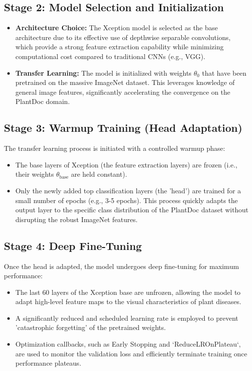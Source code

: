 \documentclass[12pt, a4paper]{report}
\begin{document}
\subsection{Stage 2: Model Selection and Initialization}
\label{sec:model_selection}
\begin{itemize}
    \item \textbf{Architecture Choice:} The Xception model is selected as the base architecture due to its effective use of depthwise separable convolutions, which provide a strong feature extraction capability while minimizing computational cost compared to traditional CNNs (e.g., VGG).
    \item \textbf{Transfer Learning:} The model is initialized with weights $\theta_0$ that have been pretrained on the massive ImageNet dataset. This leverages knowledge of general image features, significantly accelerating the convergence on the PlantDoc domain.
\end{itemize}

\subsection{Stage 3: Warmup Training (Head Adaptation)}
\label{sec:warmup_training}
The transfer learning process is initiated with a controlled warmup phase:
\begin{itemize}
    \item The base layers of Xception (the feature extraction layers) are frozen (i.e., their weights $\theta_{\text{base}}$ are held constant).
    \item Only the newly added top classification layers (the 'head') are trained for a small number of epochs (e.g., 3-5 epochs). This process quickly adapts the output layer to the specific class distribution of the PlantDoc dataset without disrupting the robust ImageNet features.
\end{itemize}

\subsection{Stage 4: Deep Fine-Tuning}
\label{sec:fine_tuning}
Once the head is adapted, the model undergoes deep fine-tuning for maximum performance:
\begin{itemize}
    \item The last 60 layers of the Xception base are unfrozen, allowing the model to adapt high-level feature maps to the visual characteristics of plant diseases.
    \item A significantly reduced and scheduled learning rate is employed to prevent 'catastrophic forgetting' of the pretrained weights.
    \item Optimization callbacks, such as Early Stopping and `ReduceLROnPlateau`, are used to monitor the validation loss and efficiently terminate training once performance plateaus.
\end{itemize}
\end{document}
